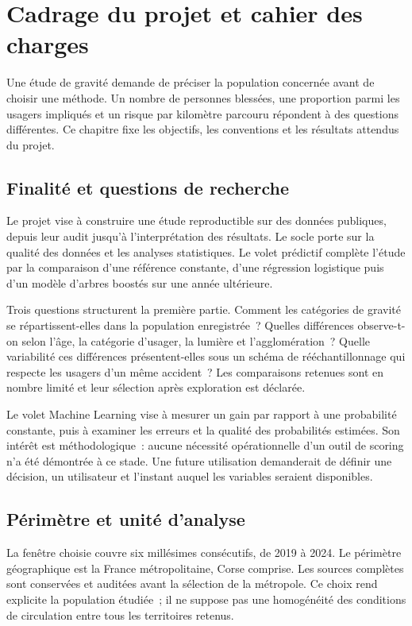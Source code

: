 \chapter{Cadrage du projet et cahier des charges}
\label{chap:cadrage}

Une étude de gravité demande de préciser la population concernée avant de choisir une
méthode. Un nombre de personnes blessées, une proportion parmi les usagers impliqués
et un risque par kilomètre parcouru répondent à des questions différentes. Ce chapitre
fixe les objectifs, les conventions et les résultats attendus du projet.

\section{Finalité et questions de recherche}
Le projet vise à construire une étude reproductible sur des données publiques, depuis
leur audit jusqu'à l'interprétation des résultats. Le socle porte sur la qualité des
données et les analyses statistiques. Le volet prédictif complète l'étude
par la comparaison d'une référence constante, d'une régression logistique puis d'un
modèle d'arbres boostés sur une année ultérieure.

Trois questions structurent la première partie. Comment les catégories de gravité se
répartissent-elles dans la population enregistrée~? Quelles différences observe-t-on
selon l'âge, la catégorie d'usager, la lumière et l'agglomération~? Quelle variabilité
ces différences présentent-elles sous un schéma de rééchantillonnage qui respecte les
usagers d'un même accident~? Les comparaisons retenues sont en nombre limité et leur
sélection après exploration est déclarée.

Le volet Machine Learning vise à mesurer un gain par rapport à une probabilité
constante, puis à examiner les erreurs et la qualité des probabilités estimées. Son
intérêt est méthodologique~: aucune nécessité opérationnelle d'un outil de scoring
n'a été démontrée à ce stade. Une future utilisation demanderait de définir une décision,
un utilisateur et l'instant auquel les variables seraient disponibles.

\section{Périmètre et unité d'analyse}
La fenêtre choisie couvre six millésimes consécutifs, de 2019 à 2024. Le périmètre
géographique est la France métropolitaine, Corse comprise. Les sources complètes sont
conservées et auditées avant la sélection de la métropole. Ce choix rend explicite la
population étudiée~; il ne suppose pas une homogénéité des conditions de circulation
entre tous les territoires retenus.

